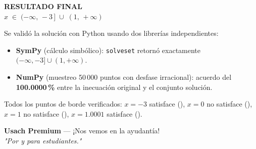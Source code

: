 \documentclass[letterpaper, 12pt]{article}
\begin{document}
\bigskip

\begin{tcolorbox}[colback=azulFuerte, colframe=azulFuerte,
    colupper=white, arc=10pt, boxrule=1.5pt, enhanced,
    drop shadow={black!15}]
    \centering
    \large\textbf{RESULTADO FINAL}\\[0.5em]
    \LARGE
    $\displaystyle
        x \;\in\; (-\infty,\,-3\,] \;\cup\; (1,\,+\infty)$
\end{tcolorbox}

\vspace{0.8cm}

\begin{tcolorbox}[colback=verdePaso!8, colframe=verdePaso, arc=8pt,
    boxrule=1pt, enhanced,
    title={\bfseries\color{white} Verificaci\'on num\'erica (SymPy + NumPy)},
    colbacktitle=verdePaso, fonttitle=\bfseries]
    \small
    Se valid\'o la soluci\'on con Python usando dos librer\'ias independientes:
    \begin{itemize}[leftmargin=1.2cm, itemsep=2pt]
        \item \textbf{SymPy} (c\'alculo simb\'olico): \;
              \texttt{solveset} retorn\'o exactamente
              $(-\infty,-3]\cup(1,+\infty)$.
        \item \textbf{NumPy} (muestreo 50\,000 puntos con desfase irracional):
              acuerdo del \textbf{100.0000\,\%} entre la inecuaci\'on original
              y el conjunto soluci\'on.
    \end{itemize}
    Todos los puntos de borde verificados:
    $x = -3$ satisface (\checkmark),
    $x = 0$ no satisface (\checkmark),
    $x = 1$ no satisface (\checkmark),
    $x = 1.0001$ satisface (\checkmark).
\end{tcolorbox}

\vspace{1cm}
\begin{center}
    \small\textbf{Usach Premium} --- ¡Nos vemos en la ayudant\'ia! \\
    \textit{"Por y para estudiantes."}
\end{center}
\end{document}
